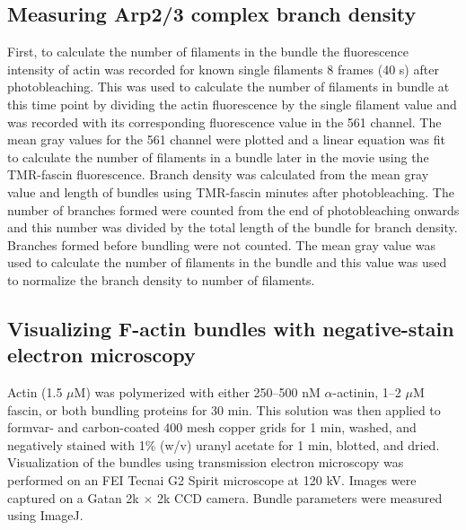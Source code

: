 \subsection{Measuring Arp2/3 complex branch density}
First, to calculate the number of filaments in the bundle the fluorescence intensity of actin was recorded for known single filaments 8 frames (40 s) after photobleaching. This was used to calculate the number of filaments in bundle at this time point by dividing the actin fluorescence by the single filament value and was recorded with its corresponding fluorescence value in the 561 channel. The mean gray values for the 561 channel were plotted and a linear equation was fit to calculate the number of filaments in a bundle later in the movie using the TMR-fascin fluorescence. Branch density was calculated from the mean gray value and length of bundles using TMR-fascin  minutes after photobleaching. The number of branches formed were counted from the end of photobleaching onwards and this number was divided by the total length of the bundle for branch density. Branches formed before bundling were not counted. The mean gray value was used to calculate the number of filaments in the bundle and this value was used to normalize the branch density to number of filaments.

\subsection{Visualizing F-actin bundles with negative-stain electron microscopy}
Actin (1.5 $\mu$M) was polymerized with either 250–500 nM $\alpha$-actinin, 1–2 $\mu$M fascin, or both bundling proteins for 30 min. This solution was then applied to formvar- and carbon-coated 400 mesh copper grids for 1 min, washed, and negatively stained with 1\% (w/v) uranyl acetate for 1 min, blotted, and dried. Visualization of the bundles using transmission electron microscopy was performed on an FEI Tecnai G2 Spirit microscope at 120 kV. Images were captured on a Gatan 2k $\times$ 2k CCD camera. Bundle parameters were measured using ImageJ.

